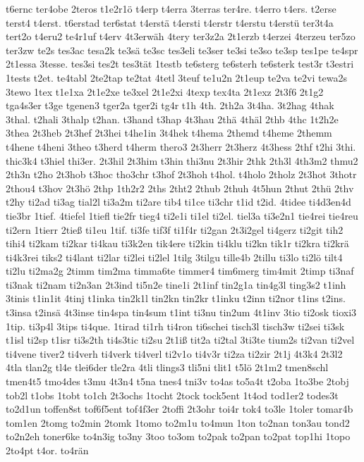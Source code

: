 {t6ernc
ter4obe
2teros
t1e2r1ö
t4erp
t4erra
3terras
ter4re.
t4erro
t4ers.
t2erse
terst4
t4erst.
t6erstad
ter6stat
t4erstä
t4ersti
t4erstr
t4erstu
t4erstü
ter3t4a
tert2o
t4eru2
te4r1uf
t4erv
4t3erwäh
4tery
ter3z2a
2t1erzb
t4erzei
4terzeu
ter5zo
ter3zw
te2s
tes3ac
tesa2k
te3sä
te3sc
tes3eli
te3ser
te3si
te3so
te3sp
tes1pe
te4spr
2t1essa
3tesse.
tes3si
tes2t
tes3tät
1testb
te6sterg
te6sterh
te6sterk
test3r
t3estri
1tests
t2et.
te4tabl
2te2tap
te2tat
4tetl
3teuf
te1u2n
2t1eup
te2va
te2vi
tewa2s
3tewo
1tex
t1e1xa
2t1e2xe
te3xel
2t1e2xi
4texp
tex4ta
2t1exz
2t3f6
2t1g2
tga4s3er
t3ge
tgenen3
tger2a
tger2i
tg4r
t1h
4th.
2th2a
3t4ha.
3t2hag
4thak
3thal.
t2hali
3thalp
t2han.
t3hand
t3hap
4t3hau
2thä
4thäl
2thb
4thc
1t2h2e
3thea
2t3heb
2t3hef
2t3hei
t4he1in
3t4hek
t4hema
2themd
t4heme
2themm
t4hene
t4heni
3theo
t3herd
t4herm
thero3
2t3herr
2t3herz
4t3hess
2thf
t2hi
3thi.
thic3k4
t3hiel
thi3er.
2t3hil
2t3him
t3hin
thi3nu
2t3hir
2thk
2th3l
4th3m2
thmu2
2th3n
t2ho
2t3hob
t3hoc
tho3chr
t3hof
2t3hoh
t4hol.
t4holo
2tholz
2t3hot
3thotr
2thou4
t3hov
2t3hö
2thp
1th2r2
2ths
2tht2
2thub
2thuh
4t5hun
2thut
2thü
2thv
t2hy
ti2ad
ti3ag
tial2l
ti3a2m
ti2are
tib4
ti1ce
ti3chr
t1id
t2id.
4tidee
ti4d3en4d
tie3br
1tief.
4tiefel
1tiefl
tie2fr
tieg4
ti2e1i
ti1el
ti2el.
tiel3a
ti3e2n1
tie4rei
tie4reu
ti2ern
1tierr
2tieß
ti1eu
1tif.
ti3fe
tif3f
ti1f4r
ti2gan
2t3i2gel
ti4gerz
ti2git
tih2
tihi4
ti2kam
ti2kar
ti4kau
ti3k2en
tik4ere
ti2kin
ti4klu
ti2kn
tik1r
ti2kra
ti2krä
ti4k3rei
tiks2
ti4lant
ti2lar
ti2lei
ti2lel
1tilg
3tilgu
tille4b
2tillu
ti3lo
ti2lö
tilt4
ti2lu
ti2ma2g
2timm
tim2ma
timma6te
timmer4
tim6merg
tim4mit
2timp
ti3naf
ti3nak
ti2nam
ti2n3an
2t3ind
ti5n2e
tine1i
2t1inf
tin2g1a
tin4g3l
ting3s2
t1inh
3tinis
t1in1it
4tinj
t1inka
tin2k1l
tin2kn
tin2kr
t1inku
t2inn
ti2nor
t1ins
t2ins.
t3insa
t2insä
4t3inse
tin4spa
tin4sum
t1int
ti3nu
tin2um
4t1inv
3tio
ti2osk
tioxi3
1tip.
ti3p4l
3tips
ti4que.
1tirad
ti1rh
ti4ron
ti6schei
tisch3l
tisch3w
ti2sei
ti3sk
t1isl
ti2sp
t1isr
ti3s2th
ti4s3tic
ti2su
2t1iß
tit2a
ti2tal
3ti3te
tium2s
ti2van
ti2vel
ti4vene
tiver2
ti4verh
ti4verk
ti4verl
ti2v1o
ti4v3r
ti2za
ti2zir
2t1j
4t3k4
2t3l2
4tla
tlan2g
tl4e
tlei6der
tle2ra
4tli
tlings3
tli5ni
tlit1
t5lö
2t1m2
tmen8schl
tmen4t5
tmo4des
t3mu
4t3n4
t5na
tnes4
tni3v
to4as
to5a4t
t2oba
1to3be
2tobj
tob2l
t1obs
1tobt
to1ch
2t3ochs
1tocht
2tock
tock5ent
1t4od
tod1er2
todes3t
to2d1un
toffen8st
tof6f5ent
tof4f3er
2toffi
2t3ohr
toi4r
tok4
to3le
1toler
tomar4b
tom1en
2tomg
to2min
2tomk
1tomo
to2m1u
to4mun
1ton
to2nan
ton3au
tond2
to2n2eh
toner6ke
to4n3ig
to3ny
3too
to3om
to2pak
to2pan
to2pat
top1hi
1topo
2to4pt
t4or.
to4rän
}
